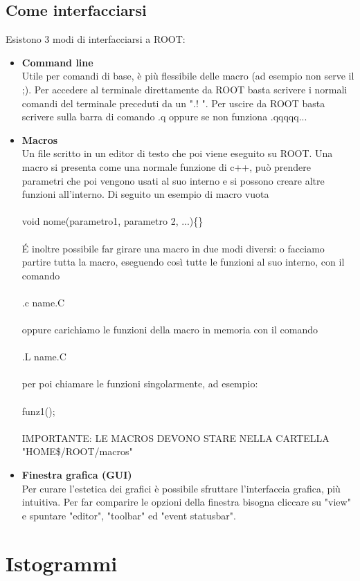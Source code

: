 \documentclass[10pt,a4paper]{article}
\begin{document}
\subsection{Come interfacciarsi}
Esistono 3 modi di interfacciarsi a ROOT: 
\begin{itemize}
\item \textbf{Command line}\\
Utile per comandi di base, è più flessibile delle macro (ad esempio non serve il ;). Per accedere al terminale direttamente da ROOT basta scrivere i normali comandi del terminale preceduti da un ".! ". Per uscire da ROOT basta scrivere sulla barra di comando .q oppure se non funziona .qqqqq...
\item \textbf{Macros}\\
Un file scritto in un editor di testo che poi viene eseguito su ROOT. Una macro si presenta come una normale funzione di c++, può prendere parametri che poi vengono usati al suo interno e si possono creare altre funzioni all'interno. Di seguito un esempio di macro vuota\\\\
void nome(parametro1, parametro 2, ...)\{\}\\\\
\'{E} inoltre possibile far girare una macro in due modi diversi: o facciamo partire tutta la macro, eseguendo così tutte le funzioni al suo interno, con il comando\\\\
.c name.C\\\\
oppure carichiamo le funzioni della macro in memoria con il comando\\\\
.L name.C\\\\
per poi chiamare le funzioni singolarmente, ad esempio:\\\\
funz1();\\\\
IMPORTANTE: LE MACROS DEVONO STARE NELLA CARTELLA "HOME\$/ROOT/macros"
\item \textbf{Finestra grafica (GUI)}\\
Per curare l'estetica dei grafici è possibile sfruttare l'interfaccia grafica, più intuitiva. Per far comparire le opzioni della finestra bisogna cliccare su "view" e spuntare "editor", "toolbar" ed "event statusbar". 
\end{itemize}
\section{Istogrammi}
\end{document}
